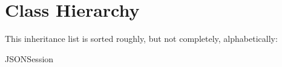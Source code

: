 \section{Class Hierarchy}
This inheritance list is sorted roughly, but not completely, alphabetically\+:\begin{DoxyCompactList}
\item {}
\begin{DoxyCompactList}
\item {}
\begin{DoxyCompactList}
\item {}
\end{DoxyCompactList}
\end{DoxyCompactList}
\item {}
\begin{DoxyCompactList}
\item {}
\end{DoxyCompactList}
\item J\+S\+O\+N\+Session\begin{DoxyCompactList}
\item {}
\end{DoxyCompactList}
\item {}
\begin{DoxyCompactList}
\item {}
\end{DoxyCompactList}
\end{DoxyCompactList}
